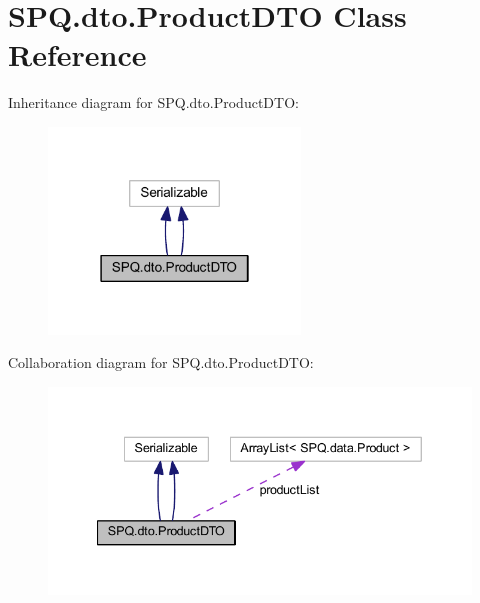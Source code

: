 \hypertarget{class_s_p_q_1_1dto_1_1_product_d_t_o}{}\section{S\+P\+Q.\+dto.\+Product\+D\+TO Class Reference}
\label{class_s_p_q_1_1dto_1_1_product_d_t_o}


Inheritance diagram for S\+P\+Q.\+dto.\+Product\+D\+TO\+:
\nopagebreak
\begin{figure}[H]
\begin{center}
\leavevmode
\includegraphics[width=190pt]{class_s_p_q_1_1dto_1_1_product_d_t_o__inherit__graph}
\end{center}
\end{figure}


Collaboration diagram for S\+P\+Q.\+dto.\+Product\+D\+TO\+:
\nopagebreak
\begin{figure}[H]
\begin{center}
\leavevmode
\includegraphics[width=340pt]{class_s_p_q_1_1dto_1_1_product_d_t_o__coll__graph}
\end{center}
\end{figure}
